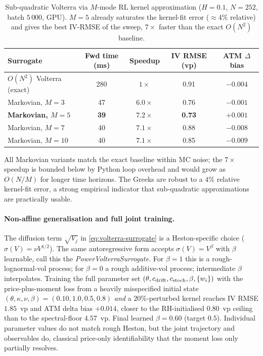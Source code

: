 \documentclass[11pt,a4paper]{article}
\begin{document}
\begin{table}[h]
\centering
\caption{Sub-quadratic Volterra via $M$-mode RL kernel approximation
($H=0.1$, $N=252$, batch $5\,000$, GPU). $M = 5$ already saturates the
kernel-fit error ($\approx 4\%$ relative) and gives the best IV-RMSE
of the sweep, $7\times$ faster than the exact $O(N^2)$ baseline.}
\label{tab:markov-volterra}
\begin{tabular}{lcccc}
\toprule
Surrogate & Fwd time (ms) & Speedup & IV RMSE (vp) & ATM $\Delta$ bias \\
\midrule
$O(N^2)$ Volterra (exact)      & 280 & $1\times$  & 0.91 & $-0.004$ \\
Markovian, $M=3$           & 47 & $6.0\times$ & 0.76 & $-0.001$ \\
\textbf{Markovian, $M=5$}      & \textbf{39} & \textbf{$7.2\times$} & \textbf{0.73} & \textbf{$+0.001$} \\
Markovian, $M=7$           & 40 & $7.1\times$ & 0.88 & $-0.008$ \\
Markovian, $M=10$          & 40 & $7.1\times$ & 0.85 & $-0.009$ \\
\bottomrule
\end{tabular}
\end{table}

All Markovian variants match the exact baseline within MC noise; the
$7\times$ speedup is bounded below by Python loop overhead and would
grow as $O(N/M)$ for longer time horizons. The Greeks are robust to a
$4\%$ relative kernel-fit error, a strong empirical indicator that
sub-quadratic approximations are practically usable.

\paragraph{Non-affine generalisation and full joint training.}
The diffusion term $\sqrt{V_j}$ in \eqref{eq:volterra-surrogate} is a
Heston-specific choice ($\sigma(V) = \nu V^{1/2}$). The same
autoregressive form accepts $\sigma(V) = V^\beta$ with $\beta$
learnable, call this the \emph{PowerVolterraSurrogate}. For
$\beta = 1$ this is a rough-lognormal-vol process; for $\beta = 0$ a
rough additive-vol process; intermediate $\beta$ interpolates.
Training the full parameter set
$(\theta, c_{\rm drift}, c_{\rm stoch}, \beta, \{w_i\})$ with the
price-plus-moment loss from a heavily misspecified initial state
$(\theta, \kappa, \nu, \beta) = (0.10, 1.0, 0.5, 0.8)$ \emph{and} a
$20\%$-perturbed kernel reaches IV RMSE $1.85$~vp and ATM delta bias
$+0.014$, closer to the RH-initialised $0.80$~vp ceiling than to
the spectral-floor $4.57$~vp. Final learned $\beta = 0.60$ (target
$0.5$). Individual parameter values do not match rough Heston, but
the joint trajectory and observables do, classical price-only
identifiability that the moment loss only partially resolves.
\end{document}
